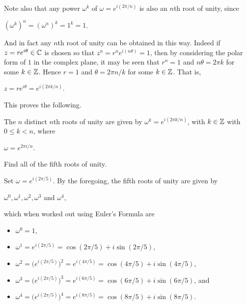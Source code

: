 \documentclass[11pt,fleqn,dvipsnames,usenames]{article}
\newcommand{\p}{\noindent}
\begin{document}
\p Note also that any power $\omega^{k}$ of $\omega = e^{i(2\pi/n)}$ is also an $n$th root of unity, since
\begin{center}
$\left(\omega^{k}\right)^{n} = \left(\omega^{n}\right)^{k} = 1^{k} = 1$.
\end{center}

\p And in fact any $n$th root of unity can be obtained in this way.  Indeed if $z = re^{i\theta}\in\mathbb{C}$ is chosen so that $z^n = r^ne^{i(n\theta)} = 1$, then by considering the polar form of $1$ in the complex plane, it may be seen that $r^{n} = 1$ and $n\theta = 2\pi k$ for some $k\in\mathbb{Z}$.  Hence $r = 1$ and $\theta = 2\pi n/k$ for some $k\in\mathbb{Z}$.  That is,
\begin{center}
$z = re^{i\theta} = e^{i(2\pi k/n)}$.
\end{center}
\p This proves the following.

\begin{theorem}\label{rootsofunityclassification}
The $n$ distinct $n$th roots of unity are given by $\omega^{k} = e^{i(2\pi k/n)}$, with $k\in\mathbb{Z}$ with $0\leq k < n$, where
\begin{center}
$\omega = e^{2\pi i/n}$.
\end{center}
\end{theorem}

\begin{example}\label{fifthrootsunityexample}
Find all of the fifth roots of unity.
\end{example}
%
\begin{solution}
Set $\omega = e^{i(2\pi/5)}$.  By the foregoing, the fifth roots of unity are given by
\begin{center}
$\omega^{0}, \omega^{1}, \omega^{2},\omega^{3}$ and $\omega^{4}$,
\end{center}
which when worked out using Euler's Formula are
\begin{itemize}[\ ]
\item $\omega^{0} = 1$,
\item $\omega^{1} = e^{i(2\pi/5)} = \cos(2\pi/5) + i\sin(2\pi/5)$,
\item $\omega^{2} = \big(e^{i(2\pi/5)}\big)^2 = e^{i(4\pi/5)} = \cos(4\pi/5) + i \sin(4\pi/5)$,
\item $\omega^{3} = \big(e^{i(2\pi/5)}\big)^3 = e^{i(6\pi/5)} = \cos(6\pi/5) + i\sin(6\pi/5)$, and
\item $\omega^{4} = \big(e^{i(2\pi/5)}\big)^4 = e^{i(8\pi/5)} = \cos(8\pi/5) + i\sin(8\pi/5)$.
\end{itemize}
\end{solution}
\newpage
\end{document}
